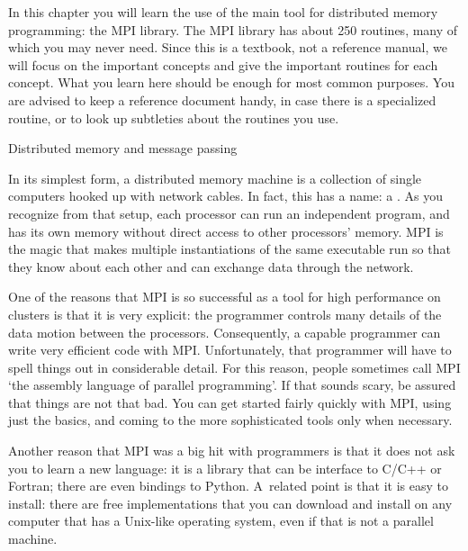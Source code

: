 
In this chapter you will learn the use of the main tool for 
distributed memory programming: the \acf{MPI} library.
The \ac{MPI} library has about 250 routines, many of which you may
never need. Since this is a textbook, not a reference manual, we will
focus on the important concepts and give the important routines for
each concept. What you learn here should be enough for most common
purposes. You are advised to keep a reference document handy, in
case there is a specialized routine, or to look up subtleties about
the routines you use.

 {Distributed memory and message passing}

In its simplest form, a distributed memory machine is a collection of
single computers hooked up with network cables. In fact, this has a name:
a . As you recognize from that setup, 
each processor can run an independent program, and has its own memory
without direct access to other processors' memory. MPI is the magic
that makes multiple instantiations of the same executable run
so that they know about each other and can exchange data through the 
network.

One of the reasons that MPI is so successful as a tool for high
performance on clusters is that it is very explicit: the programmer
controls many details of the data motion between the processors.
Consequently, a capable programmer can write very efficient code with MPI.
Unfortunately, that programmer will have to spell things out
in considerable detail. For this reason, people sometimes call MPI
`the assembly language of parallel programming'. If that sounds scary,
be assured that things are not that bad. You can get started 
fairly quickly with MPI, using just the basics,
and coming to the more sophisticated tools 
only when necessary.

Another reason that MPI was a big hit with programmers is that
it does not ask you to learn a new language: it is a library that 
can be interface to C/C++ or Fortran; there are even bindings to Python.
A~related point is that it is easy to install: there are free implementations
that you can download and install on any computer that has a Unix-like
operating system, even if that is not a parallel machine.

